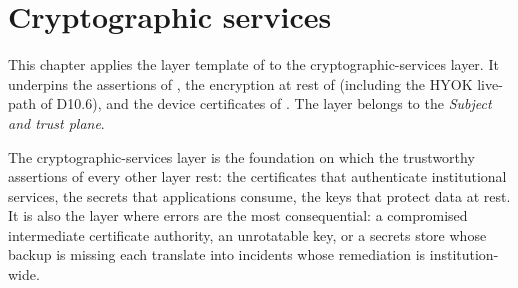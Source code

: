
\chapter{Cryptographic services}
\label{ch:crypto}

\begin{caveatbox}[Dependencies]
\noindent This chapter applies the layer template of
 to the cryptographic-services layer. It
underpins the assertions of , the encryption
at rest of  (including the HYOK live-path of
D10.6), and the device certificates of . The
layer belongs to the \emph{Subject and trust plane}.
\end{caveatbox}

The cryptographic-services layer is the foundation on which the
trustworthy assertions of every other layer rest: the certificates
that authenticate institutional services, the secrets that
applications consume, the keys that protect data at rest. It is
also the layer where errors are the most consequential: a
compromised intermediate certificate authority, an unrotatable key,
or a secrets store whose backup is missing each translate into
incidents whose remediation is institution-wide.

